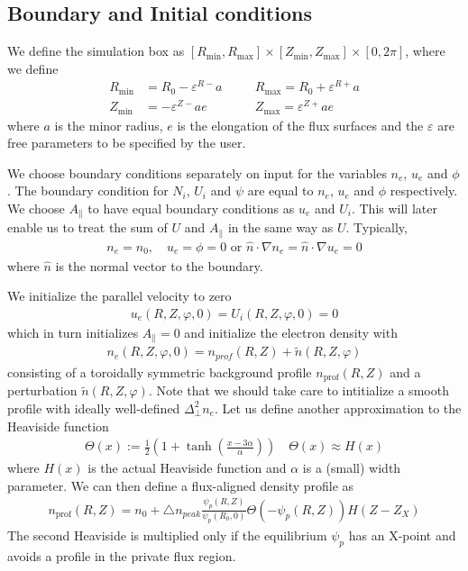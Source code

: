 \subsection{Boundary and Initial conditions}
We define the simulation box as
$[ R_{\min}, R_{\max}]\times [Z_{\min}, Z_{\max}] \times [0,2\pi]$,
where we define
\begin{align} \label{eq:box}
    R_{\min}&=R_0-\varepsilon^{R-}a\quad
    &&R_{\max}=R_0+\varepsilon^{R+}a\nonumber\\
    Z_{\min}&=-\varepsilon^{Z-}ae\quad
    &&Z_{\max}=\varepsilon^{Z+}ae
\end{align}
where $a$ is the minor radius, $e$ is the elongation of the flux surfaces and
the $\varepsilon$ are free parameters to be specified by the user.

We choose boundary conditions separately on input for the variables
$n_e$, $u_e$ and $\phi$. The boundary condition for $N_i$, $U_i$ and
$\psi$ are equal to $n_e$, $u_e$ and $\phi$ respectively.
We choose $A_\parallel$ to have equal boundary conditions as $u_e$ and $U_i$.
This will later enable us to treat the sum of $U$ and $A_\parallel$
in the same way as $U$.
Typically,
\begin{align}
n_e = n_0, \quad u_e = \phi = 0
\text{ or } \hat n \cdot \nabla n_e = \hat n \cdot \nabla u_e = 0
\end{align}
where $\hat n$ is the normal vector to the boundary.

We initialize the parallel velocity to zero
\begin{align}
  u_e(R,Z,\varphi,0) = U_i(R,Z,\varphi,0) = 0
  \label{}
\end{align}
which in turn initializes $A_\parallel = 0$
and initialize the electron density with
\begin{align} \label{eq:initial_ne}
    n_e(R,Z,\varphi, 0)= n_{prof}(R,Z) + \tilde n(R,Z,\varphi)
\end{align}
consisting of a toroidally symmetric background profile $n_{\text{prof}}(R,Z)$ and a perturbation
$\tilde n(R,Z,\varphi)$.
Note that we should take care to intitialize a smooth profile with ideally well-defined $\Delta^2_\perp n_e$.
Let us define another approximation to the Heaviside function
\begin{align}
  \Theta(x) := \frac{1}{2}\left( 1 + \tanh\left( \frac{x-3\alpha}{ \alpha} \right) \right) \quad \Theta(x) \approx H(x)
  \label{eq:heaviside_profile}
\end{align}
where $H(x)$ is the actual Heaviside function and
$\alpha$ is a (small) width parameter.
We can then define a flux-aligned density profile as
\begin{align} \label{eq:density_profile}
  n_{\text{prof}}(R,Z)=
      n_0 + \triangle n_{peak}\frac{\psi_p(R,Z)}{\psi_p(R_0, 0)} \Theta( -\psi_p(R,Z)) H(Z-Z_X)
\end{align}
The second Heaviside is multiplied only if the equilibrium $\psi_p$ has an
X-point and avoids a profile in the private flux region.

